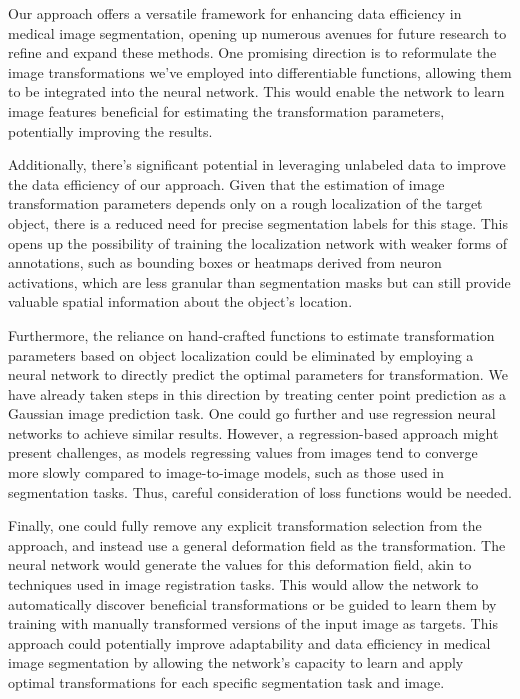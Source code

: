 Our approach offers a versatile framework for enhancing data efficiency in medical image segmentation, opening up numerous avenues for future research to refine and expand these methods. One promising direction is to reformulate the image transformations we've employed into differentiable functions, allowing them to be integrated into the neural network. This would enable the network to learn image features beneficial for estimating the transformation parameters, potentially improving the results.

Additionally, there's significant potential in leveraging unlabeled data to improve the data efficiency of our approach. Given that the estimation of image transformation parameters depends only on a rough localization of the target object, there is a reduced need for precise segmentation labels for this stage. This opens up the possibility of training the localization network with weaker forms of annotations, such as bounding boxes or heatmaps derived from neuron activations, which are less granular than segmentation masks but can still provide valuable spatial information about the object's location.

Furthermore, the reliance on hand-crafted functions to estimate transformation parameters based on object localization could be eliminated by employing a neural network to directly predict the optimal parameters for transformation. We have already taken steps in this direction by treating center point prediction as a Gaussian image prediction task. One could go further and use regression neural networks to achieve similar results. However, a regression-based approach might present challenges, as models regressing values from images tend to converge more slowly compared to image-to-image models, such as those used in segmentation tasks. Thus, careful consideration of loss functions would be needed.

Finally, one could fully remove any explicit transformation selection from the approach, and instead use a general deformation field as the transformation. The neural network would generate the values for this deformation field, akin to techniques used in image registration tasks. This would allow the network to automatically discover beneficial transformations or be guided to learn them by training with manually transformed versions of the input image as targets. This approach could potentially improve adaptability and data efficiency in medical image segmentation by allowing the network's capacity to learn and apply optimal transformations for each specific segmentation task and image.

